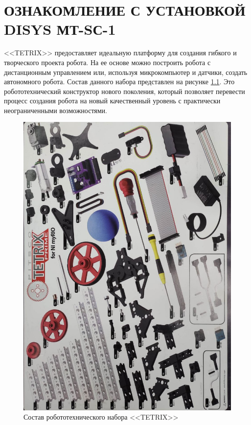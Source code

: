 \chapter{ОЗНАКОМЛЕНИЕ С УСТАНОВКОЙ DISYS МТ-SС-1}
<<TETRIX>> предоставляет идеальную платформу для создания гибкого
и творческого проекта робота. На ее основе можно построить робота
с дистанционным управлением или, используя микрокомпьютер
и датчики, создать автономного робота. Состав данного набора
представлен на рисунке \ref{fig:all}.
Это робототехнический конструктор
нового поколения, который позволяет перевести процесс создания робота
на новый качественный уровень с практически неограниченными возможностями.
\\
\begin{figure}[hb]
    \centering
    \includegraphics[scale=0.35]{fig/2.1.jpg}
    \caption{Состав робототехнического набора <<TETRIX>>}
    \label{fig:all}
\end{figure}

